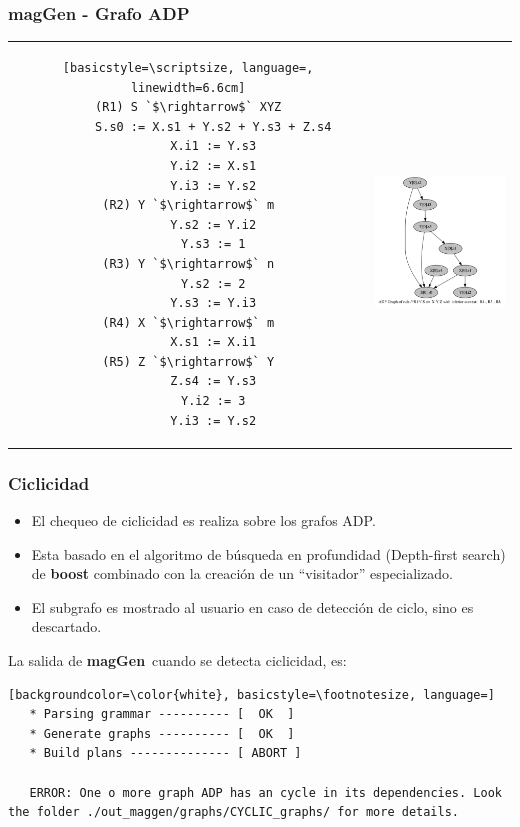 \documentclass[10pt, xcolor=table]{beamer}
\newcommand{\maggen}{\textbf{magGen}}
\begin{document}
\begin{frame}[fragile]
    \frametitle{magGen - Grafo ADP}
\begin{tabular}{c p{4.5cm}}
\hspace{-0.5cm}\begin{lstlisting}[basicstyle=\scriptsize, language=, linewidth=6.6cm]
(R1) S `$\rightarrow$` XYZ
       S.s0 := X.s1 + Y.s2 + Y.s3 + Z.s4
       X.i1 := Y.s3
       Y.i2 := X.s1
       Y.i3 := Y.s2
(R2) Y `$\rightarrow$` m
       Y.s2 := Y.i2
       Y.s3 := 1
(R3) Y `$\rightarrow$` n
       Y.s2 := 2
       Y.s3 := Y.i3
(R4) X `$\rightarrow$` m
       X.s1 := X.i1
(R5) Z `$\rightarrow$` Y
       Z.s4 := Y.s3
       Y.i2 := 3
       Y.i3 := Y.s2
\end{lstlisting}
&\hspace{0.2cm}\parbox[c]{1em}{\includegraphics[width=149px, height=150px]{./16_adp_graph.png}}
\end{tabular}

\end{frame}

\begin{frame}[fragile]
    \frametitle{Ciclicidad}

    \begin{block}{}
	\begin{itemize}
	    \item El chequeo de ciclicidad es realiza sobre los grafos ADP.
	    \pause
	    \item Esta basado en el algoritmo de búsqueda en profundidad (Depth-first search) de \textbf{boost} combinado con la creación de un ``visitador'' especializado.
	    \pause
	    \item El subgrafo es mostrado al usuario en caso de detección de ciclo, sino es descartado.
	\end{itemize}
    \end{block}
    \pause

La salida de \maggen\ cuando se detecta ciclicidad, es:

\begin{lstlisting}[backgroundcolor=\color{white}, basicstyle=\footnotesize, language=] 
   * Parsing grammar ---------- [  OK  ]
   * Generate graphs ---------- [  OK  ]
   * Build plans -------------- [ ABORT ]

   ERROR: One o more graph ADP has an cycle in its dependencies. Look the folder ./out_maggen/graphs/CYCLIC_graphs/ for more details.
\end{lstlisting}
\end{frame}
\end{document}
